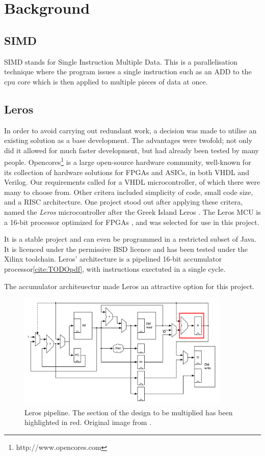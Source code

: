 \section{Background}
\subsection{SIMD}

SIMD stands for Single Instruction Multiple Data.  This is a parallelisation
technique where the program issues a single instruction such as an ADD to the
cpu core which is then applied to multiple pieces of data at once.

\subsection{Leros}
In order to avoid carrying out redundant work, a decision was made to utilise an
existing solution as a base development. The advantages were twofold; not only
did it allowed for much faster development, but had already been tested by many
people. Opencores\footnote{
http://www.opencores.com
}
is a large open-source hardware community, well-known for its collection of hardware solutions for
FPGAs and ASICs, in both VHDL and Verilog. Our requirements called for a VHDL
microcontroller, of which there were many to choose from. Other critera included
simplicity of code, small code size, and a RISC architecture. One project stood out
after applying these critera, named the \emph{Leros} microcontroller after the
Greek Island Leros \cite{cite:TODO}.  The Leros MCU is a 16-bit
processor optimized for FPGAs \cite{cite:TODO}, and was selected for use in this
project.

 It is a stable
project and can even be programmed in a restricted subset of Java. It is licenced
under the permissive BSD licence and has been tested under the Xilinx toolchain.
Leros' architecture is a pipelined 16-bit accumulator processor\ref{cite:TODOpdf},
with instructions exectuted in a single cycle.

The accumulator architeuectur made Leros an attractive option for this project.

\begin{figure}[h]
\center
\includegraphics[width=0.9\textwidth]{images/leros-system}
\caption{Leros pipeline. The section of the design to be multiplied has been
highlighted in red. Original image from \cite{cite:TODO-pdf}.
}
\label{fig:leros-system}
\end{figure}
